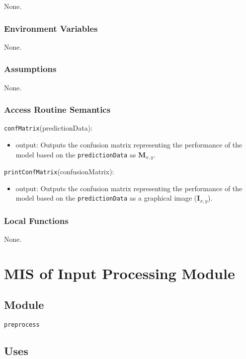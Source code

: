\documentclass[12pt, titlepage]{article}
\def\code#1{\texttt{#1}}
\begin{document}
None.

\subsubsection{Environment Variables}

None.

\subsubsection{Assumptions}

None.

\subsubsection{Access Routine Semantics}

\noindent \code{confMatrix}(predictionData):
\begin{itemize} 
\item output: Outputs the confusion matrix representing the performance of the model based on the
\code{predictionData} as $\mathbf{M}_{x,y}$.
\end{itemize}

\noindent \code{printConfMatrix}(confusionMatrix):
\begin{itemize} 
\item output: Outputs the confusion matrix representing the performance of the model based on the
\code{predictionData} as a graphical image ($\mathbf{I}_{x,y}$).
\end{itemize}

\subsubsection{Local Functions}

None.

\section{MIS of Input Processing Module} \label{ModuleIP} 

\subsection{Module}

\code{preprocess}

\subsection{Uses}
\end{document}
